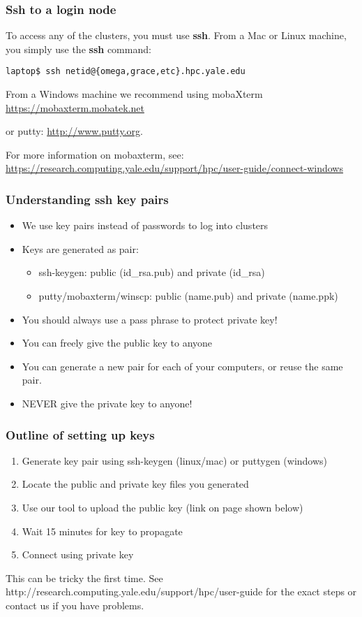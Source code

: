 \documentclass[10pt]{beamer}
\begin{document}
\begin{frame}[fragile]
\frametitle{Ssh to a login node}
To access any of the clusters, you must use \textbf{ssh}.
From a Mac or Linux machine, you simply use the \textbf{ssh} command:

\begin{verbatim}
laptop$ ssh netid@{omega,grace,etc}.hpc.yale.edu
\end{verbatim}

From a Windows machine we recommend using mobaXterm
\url{https://mobaxterm.mobatek.net} 

or putty: 
\url{http://www.putty.org}.

\vskip10pt
For more information on mobaxterm, see:
\url{https://research.computing.yale.edu/support/hpc/user-guide/connect-windows}
\end{frame}

\begin{frame}[fragile]
\frametitle{Understanding ssh key pairs}
\begin{itemize}
\item We use key pairs instead of passwords to log into clusters
\item Keys are generated as pair:
\begin{itemize}
\item ssh-keygen: public (id\_rsa.pub) and private (id\_rsa)
\item putty/mobaxterm/winscp: public (name.pub) and private (name.ppk)
\end{itemize}
\item You should always use a pass phrase to protect private key!
\item You can freely give the public key to anyone
\item You can generate a new pair for each of your computers, or reuse the same pair.
\item NEVER give the private key to anyone!
\end{itemize}
\end{frame}

\begin{frame}[fragile]

\frametitle{Outline of setting up keys}
\begin{enumerate}
\item Generate key pair using ssh-keygen (linux/mac) or puttygen (windows)
\item Locate the public and private key files you generated
\item Use our tool to upload the public key (link on page shown below)
\item Wait 15 minutes for key to propagate
\item Connect using private key
\end{enumerate}

This can be tricky the first time.  See http://research.computing.yale.edu/support/hpc/user-guide
for the exact steps or contact us if you have problems.

\end{frame}
\end{document}
